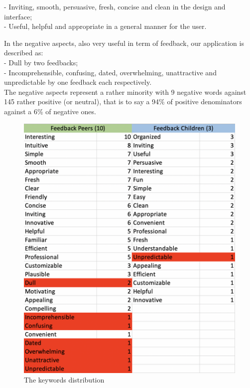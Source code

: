 \documentclass[12pt]{scrartcl}
\begin{document}
		- Inviting, smooth, persuasive, fresh, concise and clean in the design and interface;\\
		
		- Useful, helpful and appropriate in a general manner for the user.\\
		\newline		

	In the negative aspects, also very useful in term of feedback, our application is described as:\\
	
		- Dull by two feedbacks;\\
		
		- Incomprehensible, confusing, dated, overwhelming, unattractive and unpredictable by one feedback each respectively.\\

	The negative aspects represent a rather minority with 9 negative words against 145 rather positive (or neutral), that is to say a 94\% of positive denominators against a 6\% of negative ones. 


	\begin{figure}[H]
		\centering
		\includegraphics[width=\textwidth]{../images/gary_GA6_image_words_analysis.png}
		\caption{The keywords distribution}
		\label{words}
	\end{figure}
\end{document}
